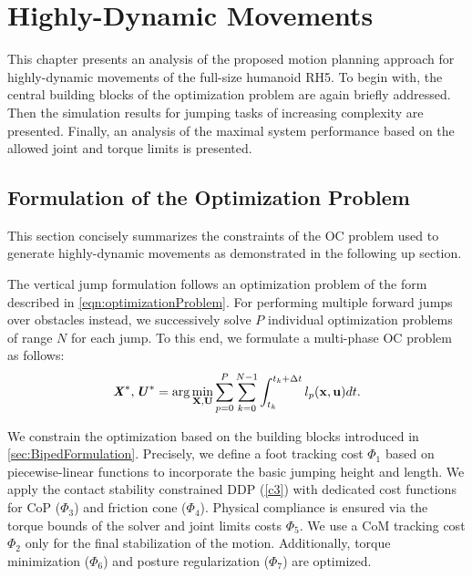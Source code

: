 
\chapter{Highly-Dynamic Movements}\label{c5}
This chapter presents an analysis of the proposed motion planning approach for highly-dynamic movements of the full-size humanoid RH5. To begin with, the central building blocks of the optimization problem are again briefly addressed. Then the simulation results for jumping tasks of increasing complexity are presented. Finally, an analysis of the maximal system performance based on the allowed joint and torque limits is presented.  


\section{Formulation of the Optimization Problem}\label{sec:HighlyFormulation}
This section concisely summarizes the constraints of the \gls{OC} problem used to generate highly-dynamic movements as demonstrated in the following up section. 

The vertical jump formulation follows an optimization problem of the form described in \cref{eqn:optimizationProblem}. For performing multiple forward jumps over obstacles instead, we successively solve $P$ individual optimization problems of range $N$ for each jump. To this end, we formulate a multi-phase \gls{OC} problem as follows: 
\begin{equation}\label{eqn:optimizationProblemSequence}
\bm{\mathit{X}}^*,\bm{\mathit{U}}^*= 
\arg\min_{\mathbf{X},\mathbf{U}} \sum_{p=0}^{P}
\sum_{k=0}^{N-1} \int_{t_k}^{t_k+\Delta t} l_p(\mathbf{x},\mathbf{u})dt. 
\end{equation} 

We constrain the optimization based on the building blocks introduced in \cref{sec:BipedFormulation}. Precisely, we define a foot tracking cost $\Phi_1$ based on piecewise-linear functions to incorporate the basic jumping height and length. We apply the contact stability constrained \gls{DDP} (\cref{c3}) with dedicated cost functions for \gls{CoP} ($\Phi_3$) and friction cone ($\Phi_4$). Physical compliance is ensured via the torque bounds of the solver and joint limits costs $\Phi_5$. We use a \gls{CoM} tracking cost $\Phi_2$ only for the final stabilization of the motion. Additionally, torque minimization ($\Phi_6$) and posture regularization ($\Phi_7$) are optimized.

